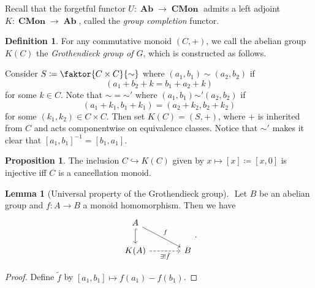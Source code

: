 \documentclass[10pt,letterpaper,cm]{nupset}
\theoremstyle{definition}
\newtheorem{definition}{Definition}
\theoremstyle{theorem}
\newtheorem{lemma}[theorem]{Lemma}
\newtheorem{prop}[theorem]{Proposition}
\theoremstyle{remark}
\newcommand{\1}{\mathbf{1}}
\newcommand{\0}{\vec 0}
\DeclareMathOperator{\Ab}{\mathbf{Ab}}
\DeclareMathOperator{\Cmon}{\mathbf{CMon}}
\begin{document}
\begin{abstract}
We begin low-dimensional $K$-theory, i.e., describe $K_0(-)$, $K_1(-)$, and $K_2(-)$, in various settings. The main sources for this talk are the following.
\begin{itemize}
\item $n$Lab.
\item Charles Weibel's \textit{The $K$-book: an introduction to algebraic $K$-theory}, Chapters I and II.
\item Eric M. Friedlander's \textit{An Introduction to $K$-theory}, Chapter 1.
\end{itemize}
\end{abstract}

\smallskip

Recall that the forgetful functor $U: \Ab \to \Cmon$ admits a left adjoint $K: \Cmon \to \Ab$, called the \textit{group completion} functor. 

\begin{definition}
For any commutative monoid $\left(C, +\right)$, we call the abelian group $K(C)$ the \textit{Grothendieck group of $G$}, which is constructed as follows.

\medskip

 Consider $S\coloneqq \faktor{C \times C}{\sim}$ where $(a_1, b_1) \sim (a_2, b_2)$ if $$(a_1 + b_2 +k = b_1 + a_2 +k)$$ for some $k\in C$. Note that $\sim = {\sim'}$ where $(a_1, b_1) {\sim'} (a_2, b_2)$ if $$(a_1 + k_1, b_1 + k_1) = (a_2 +k_2, b_2 + k_2)$$ for some $(k_1, k_2) \in C\times C$. Then set $K(C) = (S, +)$, where $+$ is inherited from $C$ and acts componentwise on equivalence classes. Notice that ${\sim'}$ makes it clear that $[a_1, b_1]^{{-}1} = [b_1, a_1]$.
\end{definition}

\begin{prop}
The inclusion $C \hookrightarrow K(C)$ given by $x \mapsto [x]\coloneqq[x, 0]$ is injective iff $C$ is a cancellation monoid.
\end{prop}

\begin{lemma}[Universal property of the Grothendieck group] $ $
Let $B$ be an abelian group and $f: A \to B$ a monoid homomorphism. Then we have 
\[
\begin{tikzcd}[column sep=large]
A \arrow[rd, "f"] \arrow[d, hook] &  \\
K(A) \arrow[swap, r, "\exists! \tilde{f}", dashed] & B
\end{tikzcd}.
\]
\end{lemma}
\begin{proof}
Define $\tilde{f}$ by $[a_1, b_1]\mapsto f(a_1) - f(b_1)$.
\end{proof}
\end{document}
